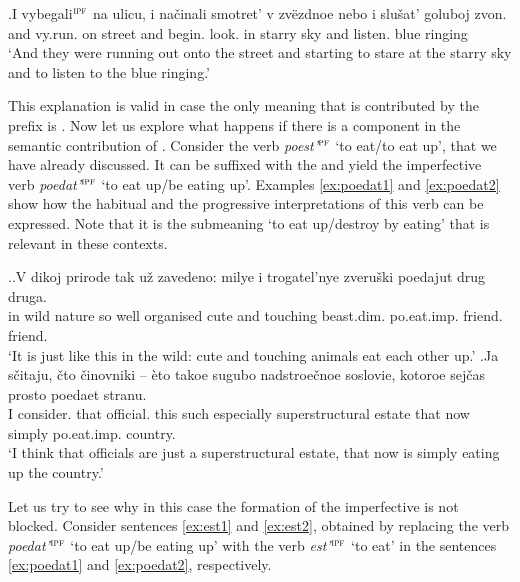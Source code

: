 \exg.\label{ex:vybegat}I vybegali$^{\textsc{ipf}}$ na ulicu, i na\v{c}inali smotret' v zv\"{e}zdnoe nebo i slu\v{s}at' goluboj zvon.\\
and vy.run. on street and begin. look. in starry sky and listen. blue ringing\\
\trans `And they were running out onto the street and starting to stare at the starry sky and to listen to the blue ringing.'

This explanation is valid in case the only meaning that is contributed by the prefix is . Now let us explore what happens if there is a  component in the semantic contribution of . Consider the verb \textit{poest'}$^{\textsc{pf}}$ `to eat/to eat up', that we have already discussed. It can be suffixed with the  and yield the imperfective verb \textit{poedat'}$^{\textsc{ipf}}$ `to eat up/be eating up'. Examples \ref{ex:poedat1} and \ref{ex:poedat2} show how the habitual and the progressive interpretations of this verb can be expressed. Note that it is the submeaning `to eat up/destroy by eating' that is relevant in these contexts.\largerpage[2]

\ex.\ag.\label{ex:poedat1}V dikoj prirode tak u\v{z} zavedeno: milye i trogatel'nye zveru\v{s}ki poedajut drug druga.\\
in wild nature so well organised cute and touching beast.dim. po.eat.imp. friend. friend.\\
\trans `It is just like this in the wild: cute and touching animals eat each other up.'
\bg.\label{ex:poedat2}Ja s\v{c}itaju, \v{c}to \v{c}inovniki -- \`{e}to takoe sugubo nadstroe\v{c}noe soslovie, kotoroe sej\v{c}as prosto poedaet stranu.\\
I consider. that official. {} this such especially superstructural estate that now simply po.eat.imp. country.\\
\trans `I think that officials are just a superstructural estate, that now is simply eating up the country.'\\

Let us try to see why in this case the formation of the imperfective is not blocked. Consider sentences \ref{ex:est1} and \ref{ex:est2}, obtained by replacing the verb \textit{poedat'}$^{\textsc{ipf}}$ `to eat up/be eating up' with the verb \textit{est'}$^{\textsc{ipf}}$ `to eat' in the sentences \ref{ex:poedat1} and \ref{ex:poedat2}, respectively.
 
